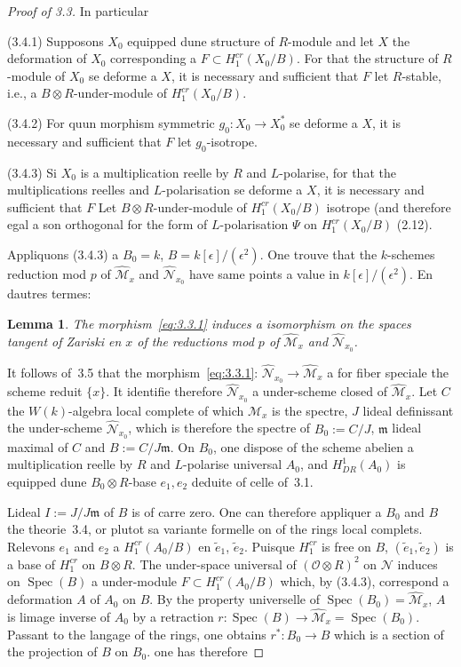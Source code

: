 \documentclass[11pt,a4paper]{article}
\theoremstyle{plain}
\newtheorem{lemma}[theorem]{Lemma}
\theoremstyle{definition}
\DeclareMathOperator{\Spec}{Spec}
\begin{document}
\begin{proof}[Proof of 3.3]
In particular

(3.4.1) Supposons $X_0$ equipped dune structure of $R$-module and let $X$ the deformation of $X_0$ corresponding a $F \subset H^{cr}_1(X_0/B)$. For that the structure of $R$-module
of $X_0$ se deforme a $X$, it is necessary and sufficient that $F$ let $R$-stable, i.e., a
$B \otimes R$-under-module of $H^{cr}_1(X_0/B)$.

(3.4.2) For quun morphism symmetric $g_0: X_0 \to X_0^*$ se deforme a $X$, it is necessary and sufficient that $F$ let $g_0$-isotrope.

(3.4.3) Si $X_0$ is a multiplication reelle by $R$ and $L$-polarise, for that the
multiplications reelles and $L$-polarisation se deforme a $X$, it is necessary and sufficient that
$F$ Let $B \otimes R$-under-module of $H^{cr}_1(X_0/B)$ isotrope (and therefore egal a son
orthogonal for the form of $L$-polarisation $\Psi$ on $H^{cr}_1(X_0/B)$ (2.12).

Appliquons (3.4.3) a $B_0 = k$, $B = k[\epsilon]/(\epsilon^2)$. One trouve that the $k$-schemes
reduction mod $p$ of $\hat{\mathscr{M}}_x$ and $\hat{\mathscr{N}}_{x_0}$ have same points a value in $k[\epsilon]/(\epsilon^2)$. En
dautres termes:

\begin{lemma}
The morphism~\eqref{eq:3.3.1} induces a isomorphism on the spaces
tangent of Zariski en $x$ of the reductions mod $p$ of $\hat{\mathscr{M}}_x$ and $\hat{\mathscr{N}}_{x_0}$.
\end{lemma}

It follows of~3.5 that the morphism~\eqref{eq:3.3.1}: $\hat{\mathscr{N}}_{x_0} \to \hat{\mathscr{M}}_x$ a for fiber speciale the
scheme reduit $\{x\}$. It identifie therefore $\hat{\mathscr{N}}_{x_0}$ a under-scheme closed of $\hat{\mathscr{M}}_x$. Let
$C$ the $W(k)$-algebra local complete of which $\hat{\mathscr{M}}_x$ is the spectre, $J$ lideal definissant
the under-scheme $\hat{\mathscr{N}}_{x_0}$, which is therefore the spectre of $B_0 := C/J$, $\mathfrak{m}$ lideal maximal of
$C$ and $B := C/J\mathfrak{m}$. On $B_0$, one dispose of the scheme abelien a multiplication reelle
by $R$ and $L$-polarise universal $A_0$, and $H^1_{DR}(A_0)$ is equipped dune $B_0 \otimes R$-base $e_1, e_2$
deduite of celle of~3.1.

Lideal $I := J/J\mathfrak{m}$ of $B$ is of carre zero. One can therefore appliquer a $B_0$ and $B$ the
theorie~3.4, or plutot sa variante formelle on of the rings local complets.
Relevons $e_1$ and $e_2$ a $H^{cr}_1(A_0/B)$ en $\tilde{e}_1$, $\tilde{e}_2$. Puisque $H^{cr}_1$ is free on $B$, $(\tilde{e}_1, \tilde{e}_2)$
is a base of $H^{cr}_1$ on $B \otimes R$. The under-space universal of $(\mathscr{O} \otimes R)^2$ on $\mathscr{N}$
induces on $\Spec(B)$ a under-module $F \subset H^{cr}_1(A_0/B)$ which, by (3.4.3), correspond
a deformation $A$ of $A_0$ on $B$. By the property universelle of
$\Spec(B_0) = \hat{\mathscr{M}}_x$, $A$ is limage inverse of $A_0$ by a retraction
$r: \Spec(B) \to \hat{\mathscr{M}}_x = \Spec(B_0)$. Passant to the langage of the rings, one obtains
$r^*: B_0 \to B$ which is a section of the projection of $B$ on $B_0$. one has therefore


\end{proof}
\end{document}
